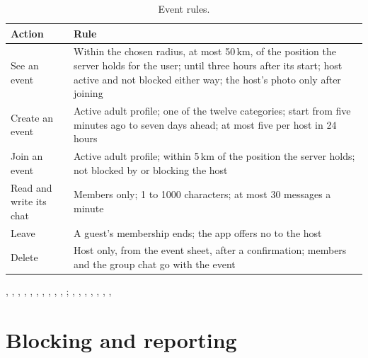 \begin{table}[ht]
  \centering
  \caption{Event rules.}
  \label{tab:event-rules}
  \tablefont
  \begin{tabularx}{\textwidth}{@{}L{34mm}Y@{}}
    \toprule
    \textsf{\textbf{Action}} & \textsf{\textbf{Rule}} \\
    \midrule
    See an event & Within the chosen radius, at most 50\,km, of the position the server holds for the user; until three hours after its start; host active and not blocked either way; the host's photo only after joining \\
    Create an event & Active adult profile; one of the twelve categories; start from five minutes ago to seven days ahead; at most five per host in 24 hours \\
    Join an event & Active adult profile; within 5\,km of the position the server holds; not blocked by or blocking the host \\
    Read and write its chat & Members only; 1 to 1000 characters; at most 30 messages a minute \\
    Leave & A guest's membership ends; the app offers no  to the host \\
    Delete & Host only, from the event sheet, after a confirmation; members and the group chat go with the event \\
    \bottomrule
  \end{tabularx}
\end{table}

\implemented
  {, , , }
  {, , , , , , , ; , }
  {, , , , , , }

\section{Blocking and reporting}
\label{sec:feature-safety}

